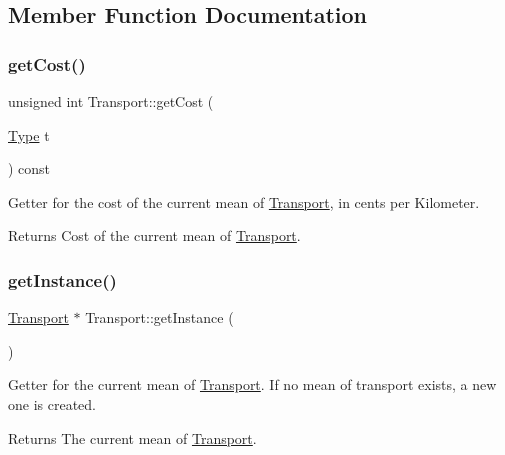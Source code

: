 \subsection{Member Function Documentation}
\hypertarget{class_transport_a943eecabe9f2435fcbf2bd3a41a4ea3a}{}\label{class_transport_a943eecabe9f2435fcbf2bd3a41a4ea3a} 
\subsubsection{\texorpdfstring{get\+Cost()}{getCost()}}
{\footnotesize\ttfamily unsigned int Transport\+::get\+Cost (\begin{DoxyParamCaption}\item[{\hyperlink{class_transport_a1879cecfed0d4238e5a7af6d085db317}{Type}}]{t }\end{DoxyParamCaption}) const}

Getter for the cost of the current mean of \hyperlink{class_transport}{Transport}, in cents per Kilometer.

\begin{DoxyReturn}{Returns}
Cost of the current mean of \hyperlink{class_transport}{Transport}. 
\end{DoxyReturn}
\hypertarget{class_transport_a2265878b8225332acf586bece5f1b324}{}\label{class_transport_a2265878b8225332acf586bece5f1b324} 
\subsubsection{\texorpdfstring{get\+Instance()}{getInstance()}}
{\footnotesize\ttfamily \hyperlink{class_transport}{Transport} $\ast$ Transport\+::get\+Instance (\begin{DoxyParamCaption}{ }\end{DoxyParamCaption})\hspace{0.3cm}{\ttfamily [static]}}

Getter for the current mean of \hyperlink{class_transport}{Transport}. If no mean of transport exists, a new one is created.

\begin{DoxyReturn}{Returns}
The current mean of \hyperlink{class_transport}{Transport}. 
\end{DoxyReturn}
\hypertarget{class_transport_ae9b8f3d27331e429160827194e32bde1}{}\label{class_transport_ae9b8f3d27331e429160827194e32bde1} 
